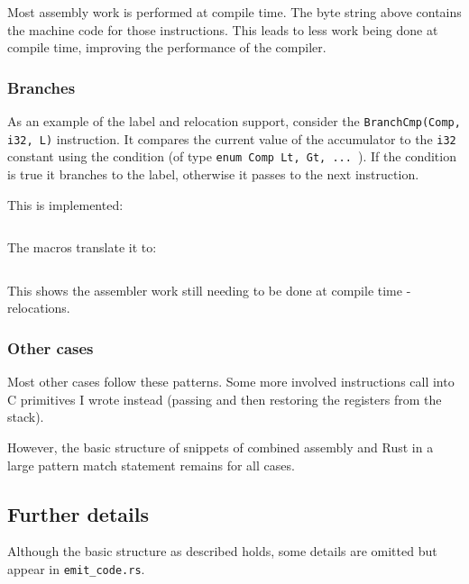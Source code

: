 \inputminted{rust}{snippets/add_comp.rs}

Most assembly work is performed at compile time. The byte string above contains the machine code
for
those instructions. This leads to less work being done at compile time, improving the performance
of the compiler.

\subsubsection{Branches}

As an example of the label and relocation support, consider the \texttt{BranchCmp(Comp, i32, L)}
instruction. It
compares the current value of the accumulator to the \texttt{i32} constant using the condition (of
type \texttt{enum Comp {Lt, Gt, ... }}). If the condition is true it branches to the label,
otherwise it passes to the next instruction.

This is implemented:

\inputminted{rust}{snippets/branchcmp.rs}

The macros translate it to:

\inputminted{rust}{snippets/branchcmp_comp.rs}

This shows the assembler work still needing to be done at compile time - relocations.

\subsubsection{Other cases}

Most other cases follow these patterns. Some more involved instructions call into C primitives
I wrote instead (passing and then restoring the registers from the stack).

However, the basic structure of snippets of combined assembly and Rust in a large pattern match
statement remains for all cases.

\subsection{Further details}

Although the basic structure as described holds, some details are omitted but appear in
\texttt{emit\_code.rs}.

